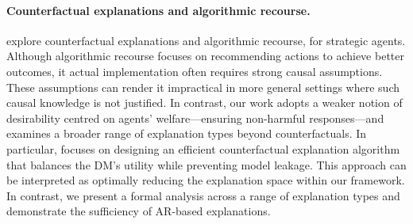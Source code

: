

\paragraph{Counterfactual explanations and algorithmic recourse.} \citet{tsirtsis2020decisions,karimi2022survey} explore counterfactual explanations and algorithmic recourse, for strategic agents. Although algorithmic recourse focuses on recommending actions to achieve better outcomes, it actual implementation often requires strong causal assumptions. These assumptions can render it impractical in more general settings where such causal knowledge is not justified.
In contrast, our work adopts a weaker notion of desirability centred on agents' welfare---ensuring non-harmful responses---and examines a broader range of explanation types beyond counterfactuals.
In particular, \citet{tsirtsis2020decisions} focuses on designing an efficient counterfactual explanation algorithm that balances the DM's utility while preventing model leakage. This approach can be interpreted as optimally reducing the explanation space within our framework. In contrast, we present a formal analysis across a range of explanation types and demonstrate the sufficiency of AR-based explanations.


